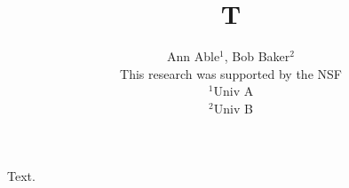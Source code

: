 \documentclass{article}
\begin{document}
\title{T}\author{Ann Able$^{1}$, Bob Baker$^{2}$\\ This research was supported by the NSF\\ $^{1}$Univ A\\ $^{2}$Univ B}
\maketitle
Text.
\end{document}
